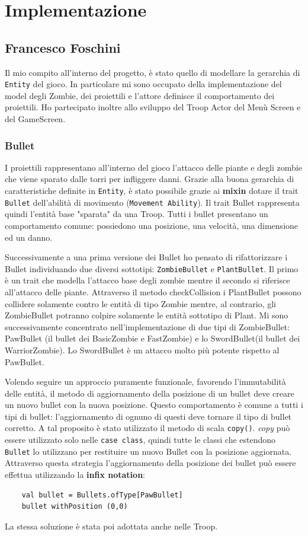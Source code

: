 \newpage
\section{Implementazione}


\subsection{Francesco Foschini}
Il mio compito all'interno del progetto, è stato quello di modellare la gerarchia di \texttt{Entity} del gioco.
In particolare mi sono occupato della implementazione del model degli Zombie, dei proiettili e l'attore definisce il comportamento dei proiettili.
Ho partecipato inoltre allo sviluppo del Troop Actor del Menù Screen e del GameScreen.

\subsubsection{Bullet}
I proiettili rappresentano all'interno del gioco l'attacco delle piante e degli zombie che viene sparato dalle torri
per infliggere danni. Grazie alla buona gerarchia di caratteristiche definite in \texttt{Entity}, è stato possibile grazie  ai \textbf{mixin}
dotare il trait \texttt{Bullet} dell'abilità di movimento (\texttt{Movement Ability}).
Il trait Bullet rappresenta quindi l'entità base "sparata" da una Troop.
Tutti i bullet presentano un comportamento comune: possiedono una posizione, una velocità, una dimensione ed un danno.


Successivamente a una prima versione dei Bullet ho pensato di rifattorizzare i Bullet individuando due diversi sottotipi: \texttt{ZombieBullet} e \texttt{PlantBullet}.
Il primo è un trait che modella l'attacco base degli zombie mentre il secondo si riferisce all'attacco delle piante.
Attraverso il metodo checkCollision i PlantBullet possono collidere solamente contro le entità di tipo Zombie mentre,
al contrario, gli ZombieBullet potranno colpire solamente le entità sottotipo di Plant.
Mi sono successivamente concentrato nell'implementazione di due tipi di ZombieBullet: PawBullet (il bullet dei
BasicZombie e FastZombie) e lo SwordBullet(il bullet dei WarriorZombie).
Lo SwordBullet è un attacco molto più potente rispetto al PawBullet.

Volendo seguire un approccio puramente funzionale, favorendo l'immutabilità delle entità, il metodo di
aggiornamento della posizione di un bullet deve creare un nuovo bullet con la nuova posizione.
Questo comportamento è comune a tutti i tipi di bullet: l'aggiornamento di ognuno di questi deve
tornare il tipo di bullet corretto. A tal proposito è stato utilizzato il metodo di scala  \texttt{copy()}.
\textit{copy} può essere utilizzato solo nelle \texttt{case class}, quindi tutte le classi che estendono
\texttt{Bullet} lo utilizzano per restituire un nuovo Bullet con la posizione aggiornata.
Attraverso questa strategia l'aggiornamento della posizione dei bullet può essere effettua utilizzando la \textbf{infix notation}:
\begin{verbatim}
    val bullet = Bullets.ofType[PawBullet]
    bullet withPosition (0,0)
\end{verbatim}
La stessa soluzione è stata poi adottata anche nelle Troop.

